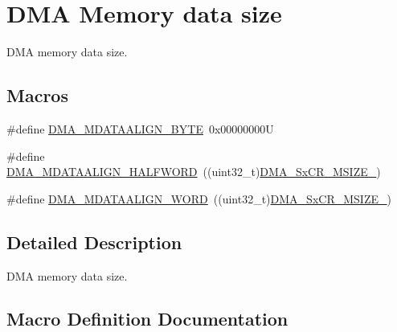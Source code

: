 \hypertarget{group___d_m_a___memory__data__size}{}\section{D\+MA Memory data size}
\label{group___d_m_a___memory__data__size}


D\+MA memory data size.  


\subsection*{Macros}
\begin{DoxyCompactItemize}
\item 
\#define \hyperlink{group___d_m_a___memory__data__size_ga9ed07bddf736298eba11508382ea4d51}{D\+M\+A\+\_\+\+M\+D\+A\+T\+A\+A\+L\+I\+G\+N\+\_\+\+B\+Y\+TE}~0x00000000U
\item 
\#define \hyperlink{group___d_m_a___memory__data__size_ga2c7355971c0da34a7ffe50ec87403071}{D\+M\+A\+\_\+\+M\+D\+A\+T\+A\+A\+L\+I\+G\+N\+\_\+\+H\+A\+L\+F\+W\+O\+RD}~((uint32\+\_\+t)\hyperlink{group___peripheral___registers___bits___definition_ga39adb60b3394b61366691b45b8c2b80f}{D\+M\+A\+\_\+\+Sx\+C\+R\+\_\+\+M\+S\+I\+Z\+E\+\_})
\item 
\#define \hyperlink{group___d_m_a___memory__data__size_ga8812da819f18c873249074f3920220b2}{D\+M\+A\+\_\+\+M\+D\+A\+T\+A\+A\+L\+I\+G\+N\+\_\+\+W\+O\+RD}~((uint32\+\_\+t)\hyperlink{group___peripheral___registers___bits___definition_gaa5c2ef08ab52de52b4e1fd785f60e263}{D\+M\+A\+\_\+\+Sx\+C\+R\+\_\+\+M\+S\+I\+Z\+E\+\_})
\end{DoxyCompactItemize}


\subsection{Detailed Description}
D\+MA memory data size. 



\subsection{Macro Definition Documentation}
\mbox{\label{group___d_m_a___memory__data__size_ga9ed07bddf736298eba11508382ea4d51}} 

